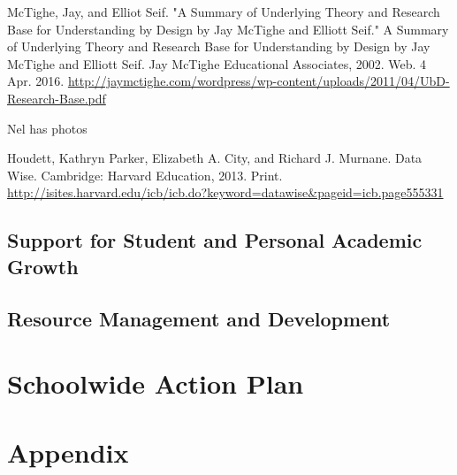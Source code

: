 \documentclass{report}
\begin{document}
\begin{evidence}
\item McTighe, Jay, and Elliot Seif. "A Summary of Underlying Theory and Research Base for Understanding by Design by Jay McTighe and Elliott Seif." A Summary of Underlying Theory and Research Base for Understanding by Design by Jay McTighe and Elliott Seif. Jay McTighe Educational Associates, 2002. Web. 4 Apr. 2016. \url{http://jaymctighe.com/wordpress/wp-content/uploads/2011/04/UbD-Research-Base.pdf}
\item Nel has photos
\item Houdett, Kathryn Parker, Elizabeth A. City, and Richard J. Murnane. Data Wise. Cambridge: Harvard Education, 2013. Print. \url{http://isites.harvard.edu/icb/icb.do?keyword=datawise&pageid=icb.page555331}
\end{evidence}
\section{Support for Student and Personal Academic Growth}
\section{Resource Management and Development}
\chapter{Schoolwide Action Plan}
\chapter{Appendix}
\end{document}
